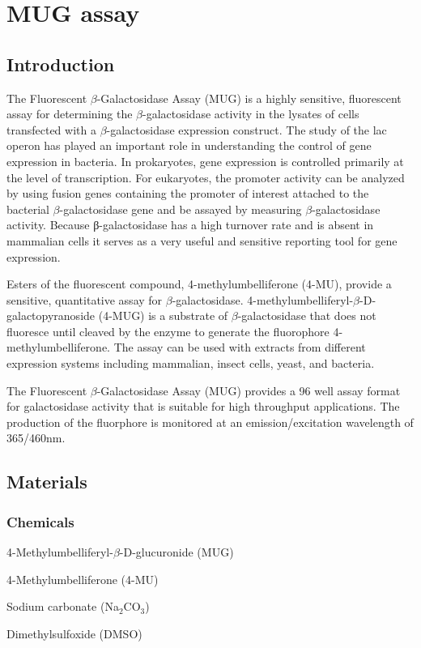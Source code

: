  \chapter{MUG assay}

\newpage
\setlength{\parindent}{0pt}
\setcounter{secnumdepth}{5}
\setcounter{section}{0}
\renewcommand*{\theHsection}{mug.\the\value{section}}
\section{Introduction}
The Fluorescent $\beta$-Galactosidase Assay (MUG){} is a highly sensitive, fluorescent assay for determining the $\beta$-galactosidase activity in the lysates of cells transfected with a $\beta$-galactosidase expression construct. The study of the lac operon has played an important role in understanding the control of gene expression in bacteria. In prokaryotes, gene expression is controlled primarily at the level of transcription. For eukaryotes, the promoter activity can be analyzed by using fusion genes containing the promoter of interest attached to the bacterial $\beta$-galactosidase gene and be assayed by measuring $\beta$-galactosidase activity. Because β-galactosidase has a high turnover rate and is absent in mammalian cells it serves as a very useful and sensitive reporting tool for gene expression.

Esters of the fluorescent compound, 4-methylumbelliferone (4-MU), provide a sensitive, quantitative assay for $\beta$-galactosidase.  4-methylumbelliferyl-$\beta$-D-galactopyranoside (4-MUG) is a substrate of $\beta$-galactosidase that does not fluoresce until cleaved by the enzyme to generate the fluorophore 4-methylumbelliferone.  The assay can be used with extracts from different expression systems including mammalian, insect cells, yeast, and bacteria.
 
The Fluorescent $\beta$-Galactosidase Assay (MUG) provides a 96 well assay format for galactosidase activity that is suitable for high throughput applications.  The production of the fluorphore is monitored at an emission/excitation wavelength of 365/460nm.
\section{Materials}
	\subsection{Chemicals}
	\begin{packed_enum}
	\item 4-Methylumbelliferyl-{$\beta$}-D-glucuronide (MUG)
	\item 4-Methylumbelliferone (4-MU)
	\item Sodium carbonate (Na$_{2}$CO$_{3}$)
	\item Dimethylsulfoxide (DMSO)
	\end{packed_enum}
		
